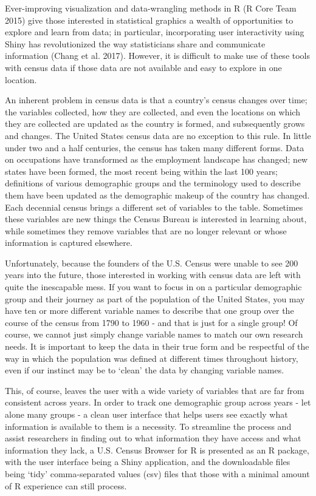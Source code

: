 \documentclass[11pt,]{article}
\begin{document}
Ever-improving visualization and data-wrangling methods in R (R Core
Team 2015) give those interested in statistical graphics a wealth of
opportunities to explore and learn from data; in particular,
incorporating user interactivity using Shiny has revolutionized the way
statisticians share and communicate information (Chang et al. 2017).
However, it is difficult to make use of these tools with census data if
those data are not available and easy to explore in one location.

An inherent problem in census data is that a country's census changes
over time; the variables collected, how they are collected, and even the
locations on which they are collected are updated as the country is
formed, and subsequently grows and changes. The United States census
data are no exception to this rule. In little under two and a half
centuries, the census has taken many different forms. Data on
occupations have transformed as the employment landscape has changed;
new states have been formed, the most recent being within the last 100
years; definitions of various demographic groups and the terminology
used to describe them have been updated as the demographic makeup of the
country has changed. Each decennial census brings a different set of
variables to the table. Sometimes these variables are new things the
Census Bureau is interested in learning about, while sometimes they
remove variables that are no longer relevant or whose information is
captured elsewhere.

Unfortunately, because the founders of the U.S. Census were unable to
see 200 years into the future, those interested in working with census
data are left with quite the inescapable mess. If you want to focus in
on a particular demographic group and their journey as part of the
population of the United States, you may have ten or more different
variable names to describe that one group over the course of the census
from 1790 to 1960 - and that is just for a single group! Of course, we
cannot just simply change variable names to match our own research
needs. It is important to keep the data in their true form and be
respectful of the way in which the population was defined at different
times throughout history, even if our instinct may be to `clean' the
data by changing variable names.

This, of course, leaves the user with a wide variety of variables that
are far from consistent across years. In order to track one demographic
group across years - let alone many groups - a clean user interface that
helps users see exactly what information is available to them is a
necessity. To streamline the process and assist researchers in finding
out to what information they have access and what information they lack,
a U.S. Census Browser for R is presented as an R package, with the user
interface being a Shiny application, and the downloadable files being
`tidy' comma-separated values (csv) files that those with a minimal
amount of R experience can still process.
\end{document}
